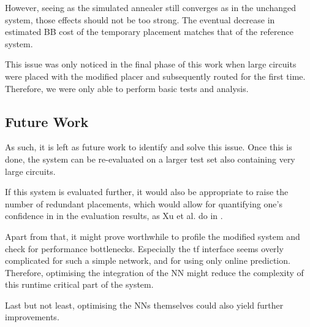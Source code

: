 However, seeing as the simulated annealer still converges as in the unchanged system, those effects should not be too strong. The eventual decrease in estimated \gls{BB} cost of the temporary placement matches that of the reference system.

This issue was only noticed in the final phase of this work when large circuits were placed with the modified placer and subsequently routed for the first time. Therefore, we were only able to perform basic tests and analysis.

\subsection{Future Work}

As such, it is left as future work to identify and solve this issue. Once this is done, the system can be re-evaluated on a larger test set also containing very large circuits. 

If this system is evaluated further, it would also be appropriate to raise the number of redundant placements, which would allow for quantifying one's confidence in in the evaluation results, as Xu et al. do in \cite{star-plus-paper}.

Apart from that, it might prove worthwhile to profile the modified system and check for performance bottlenecks. Especially the \gls{tf} interface seems overly complicated for such a simple network, and for using only online prediction. Therefore, optimising the integration of the \gls{NN} might reduce the complexity of this runtime critical part of the system.

Last but not least, optimising the \glspl{NN} themselves could also yield further improvements.
